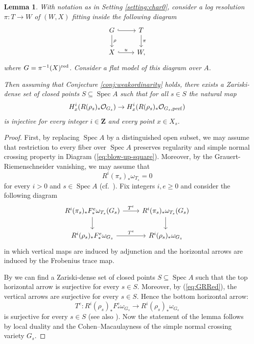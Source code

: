 \documentclass[letterpaper,11pt]{amsart}
\theoremstyle{plain}
\newtheorem{lem}[thm]{Lemma}
\theoremstyle{definition}
\theoremstyle{remark}
\def\Z{{\mathbf Z}}
\def\cO{\mathcal{O}}
\DeclareMathOperator{\Spec} {Spec}
\begin{document}
\begin{lem} \label{lem-Exceptional} 
With notation as in Setting \ref{setting:char0}, consider a log resolution $\pi \colon T \to W$ of $(W,X)$ fitting inside the following diagram
\begin{equation} \label{eq:blow-up-square}
\begin{tikzcd}
G \ar[hook]{r} \ar{d}{\rho} & T \ar{d}{\pi} \\
X \ar[hook]{r}{u} & W,
\end{tikzcd}
\end{equation}
where $G = \pi^{-1}(X)^{\rm red}$. Consider a flat model of this diagram over $A$.

Then assuming that Conjecture \ref{conj:weakordinarity} holds, there exists a Zariski-dense set of closed points $S \subseteq \Spec A$ such that for all $s \in S$ the natural map
\[ H^i_{x}(R(\rho_s)_* \cO_{G_s}) \to H^i_{x}(R(\rho_s)_* \cO_{G_s,\rm perf})\]
is injective for every integer $i \in \Z$ and every point $x \in X_s$.
\end{lem}
\begin{proof}
First, by replacing $\Spec A$ by a distinguished open subset, we may assume that restriction to every fiber over $\Spec A$ preserves regularity and simple normal crossing property in Diagram (\ref{eq:blow-up-square}). Moreover, by the Grauert-Riemenschneider vanishing, we may assume that
\begin{equation} \label{eq:GRRed}
R^i(\pi_s)_*\omega_{T_s} = 0
\end{equation}
 for every $i > 0$ and $s \in \Spec A$ (cf.\ \cite[Lemma 2.3]{kawakami2026higherfrationalsingularities}). Fix integers $i, e \geq 0$ and consider the following diagram
\[
\begin{tikzcd}
R^i(\pi_{s})_*F^e_*\omega_{T_s}(G_s) \ar{r}{T^e} \ar{d} &  R^i(\pi_{s})_*\omega_{T_s}(G_s) \ar{d} \\  
R^i(\rho_{s})_*F^e_*\omega_{G_s} \ar{r}{T^e} &  R^i(\rho_{s})_*\omega_{G_s}
\end{tikzcd}
\]
in which vertical maps are induced by adjunction and the horizontal arrows are induced by the Frobenius trace map.

By \cite[Theorem 4.4]{BST} we can find a Zariski-dense set of closed points $S \subseteq \Spec A$ such that the top horizontal arrow is surjective for every $s \in S$. Moreover, by (\ref{eq:GRRed}), the vertical arrows are surjective for every $s \in S$. Hence the bottom horizontal arrow:
\[
T^e \colon R^i(\rho_{s})_*F^e_*\omega_{G_s} \to R^i(\rho_{s})_*\omega_{G_s}
\]
is surjective for every $s \in S$ (see also \cite[(4.6.1)]{BST}). Now the statement of the lemma follows by local duality and the Cohen--Macaulayness of the simple normal crossing variety $G_s$.
\end{proof}
\end{document}
